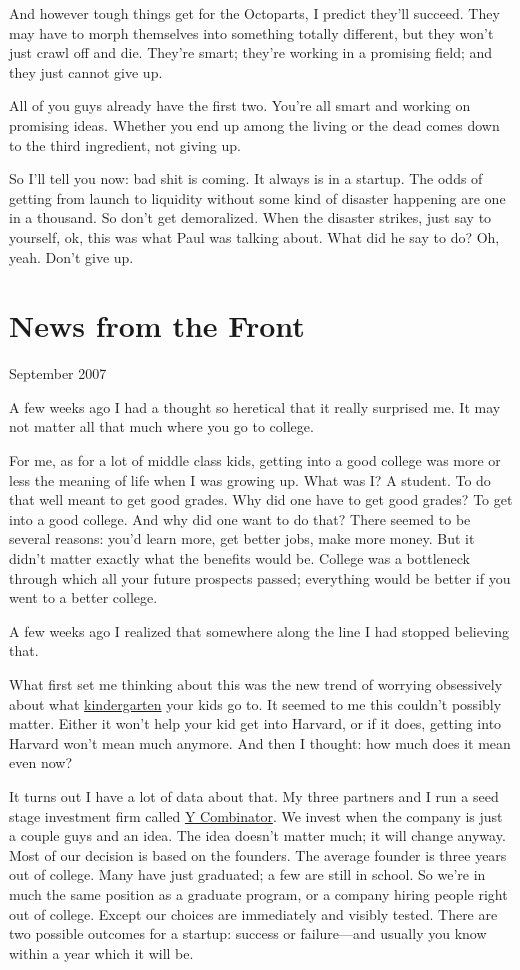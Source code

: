 \documentclass[12pt]{book}
\begin{document}
And however tough things get for the Octoparts, I predict they'll
succeed. They may have to morph themselves into something totally
different, but they won't just crawl off and die. They're smart; they're
working in a promising field; and they just cannot give up.

All of you guys already have the first two. You're all smart and working
on promising ideas. Whether you end up among the living or the dead
comes down to the third ingredient, not giving up.

So I'll tell you now: bad shit is coming. It always is in a startup. The
odds of getting from launch to liquidity without some kind of disaster
happening are one in a thousand. So don't get demoralized. When the
disaster strikes, just say to yourself, ok, this was what Paul was
talking about. What did he say to do? Oh, yeah. Don't give up.
\chapter{News from the Front}

September 2007

A few weeks ago I had a thought so heretical that it really surprised
me. It may not matter all that much where you go to college.

For me, as for a lot of middle class kids, getting into a good college
was more or less the meaning of life when I was growing up. What was I?
A student. To do that well meant to get good grades. Why did one have to
get good grades? To get into a good college. And why did one want to do
that? There seemed to be several reasons: you'd learn more, get better
jobs, make more money. But it didn't matter exactly what the benefits
would be. College was a bottleneck through which all your future
prospects passed; everything would be better if you went to a better
college.

A few weeks ago I realized that somewhere along the line I had stopped
believing that.

What first set me thinking about this was the new trend of worrying
obsessively about what
\href{http://nymag.com/nymetro/urban/education/features/15141/}{kindergarten}
your kids go to. It seemed to me this couldn't possibly matter. Either
it won't help your kid get into Harvard, or if it does, getting into
Harvard won't mean much anymore. And then I thought: how much does it
mean even now?

It turns out I have a lot of data about that. My three partners and I
run a seed stage investment firm called \href{http://ycombinator.com}{Y
Combinator}. We invest when the company is just a couple guys and an
idea. The idea doesn't matter much; it will change anyway. Most of our
decision is based on the founders. The average founder is three years
out of college. Many have just graduated; a few are still in school. So
we're in much the same position as a graduate program, or a company
hiring people right out of college. Except our choices are immediately
and visibly tested. There are two possible outcomes for a startup:
success or failure---and usually you know within a year which it will
be.
\end{document}

